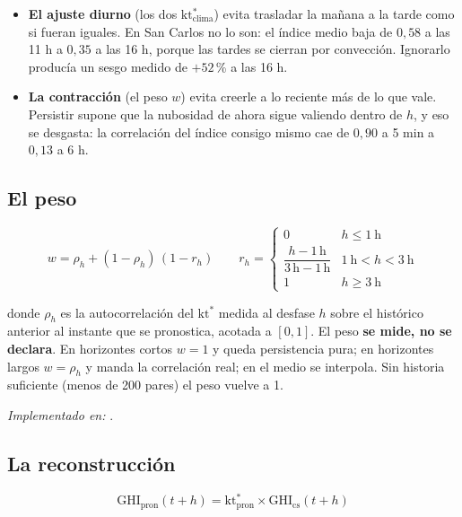 \documentclass[11pt,a4paper]{article}
\begin{document}
\begin{itemize}[leftmargin=*,itemsep=3pt]
  \item \textbf{El ajuste diurno} (los dos $\mathrm{kt^*_{clima}}$) evita trasladar la
    mañana a la tarde como si fueran iguales. En San Carlos no lo son: el índice medio
    baja de $0{,}58$ a las 11 h a $0{,}35$ a las 16 h, porque las tardes se cierran por
    convección. Ignorarlo producía un sesgo medido de $+52$\,\% a las 16 h.
  \item \textbf{La contracción} (el peso $w$) evita creerle a lo reciente más de lo que
    vale. Persistir supone que la nubosidad de ahora sigue valiendo dentro de $h$, y eso
    se desgasta: la correlación del índice consigo mismo cae de $0{,}90$ a 5 min a
    $0{,}13$ a 6 h.
\end{itemize}

\subsection{El peso}

\begin{equation*}
  w = \rho_h + (1 - \rho_h)\,(1 - r_h)
  \qquad
  r_h =
  \begin{cases}
    0 & h \leq 1\ \mathrm{h} \\
    \dfrac{h - 1\,\mathrm{h}}{3\,\mathrm{h} - 1\,\mathrm{h}} & 1\ \mathrm{h} < h < 3\ \mathrm{h} \\
    1 & h \geq 3\ \mathrm{h}
  \end{cases}
\end{equation*}

donde $\rho_h$ es la autocorrelación del $\mathrm{kt^*}$ medida al desfase $h$ sobre el
histórico anterior al instante que se pronostica, acotada a $[0,1]$. El peso \textbf{se
mide, no se declara}. En horizontes cortos $w=1$ y queda persistencia pura; en horizontes
largos $w=\rho_h$ y manda la correlación real; en el medio se interpola. Sin historia
suficiente (menos de 200 pares) el peso vuelve a 1.

\emph{Implementado en:} .

\subsection{La reconstrucción}

\begin{equation*}
  \mathrm{GHI_{pron}}(t+h) = \mathrm{kt^*_{pron}} \times \mathrm{GHI_{cs}}(t+h)
\end{equation*}
\end{document}
